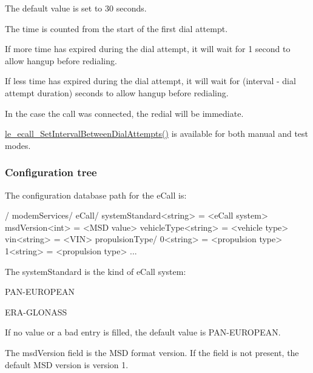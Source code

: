 The default value is set to 30 seconds.

The time is counted from the start of the first dial attempt.

If more time has expired during the dial attempt, it will wait for 1 second to allow hangup before redialing.

If less time has expired during the dial attempt, it will wait for (interval -\/ \textquotesingle{}dial attempt duration\textquotesingle{}) seconds to allow hangup before redialing.

In the case the call was connected, the redial will be immediate.

\hyperlink{le__ecall__interface_8h_af90a8602d4b1d0cacaa3971c508dd188}{le\+\_\+ecall\+\_\+\+Set\+Interval\+Between\+Dial\+Attempts()} is available for both manual and test modes.\hypertarget{c_ecall_le_ecall_configdb}{}\subsubsection{Configuration tree}\label{c_ecall_le_ecall_configdb}
The configuration database path for the e\+Call is\+: \begin{DoxyVerb}/
    modemServices/
        eCall/
            systemStandard<string> = <eCall system>
            msdVersion<int> = <MSD value>
            vehicleType<string> = <vehicle type>
            vin<string> = <VIN>
            propulsionType/
                0<string> = <propulsion type>
                1<string> = <propulsion type>
                ...
\end{DoxyVerb}


The \textquotesingle{}system\+Standard\textquotesingle{} is the kind of e\+Call system\+:
\begin{DoxyItemize}
\item P\+A\+N-\/\+E\+U\+R\+O\+P\+E\+A\+N
\item E\+R\+A-\/\+G\+L\+O\+N\+A\+S\+S
\end{DoxyItemize}

If no value or a bad entry is filled, the default value is \textquotesingle{}P\+A\+N-\/\+E\+U\+R\+O\+P\+E\+A\+N\textquotesingle{}.

The \textquotesingle{}msd\+Version\textquotesingle{} field is the M\+S\+D format version. If the field is not present, the default M\+S\+D version is version 1.

